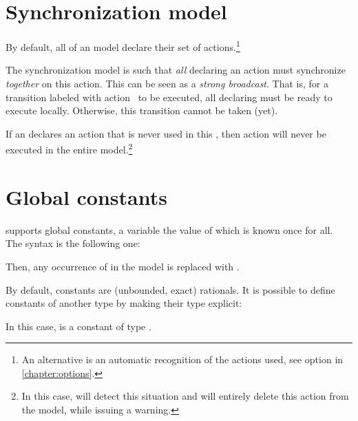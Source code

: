 \section{Synchronization model}\label{sect:synchronization}

By default, all \IPTA{} of an \imitator{} model declare their set of actions.\footnote{%
	An alternative is an automatic recognition of the actions used, see option  in \cref{chapter:options}.
}

The \imitator{} synchronization model is such that \emph{all} \IPTA{} declaring an action must synchronize \emph{together} on this action.
This can be seen as a \emph{strong broadcast}.
That is, for a transition labeled with action~ to be executed, all \IPTA{} declaring  must be ready to execute  locally.
Otherwise, this transition cannot be taken (yet).

If an \IPTA{} declares an action  that is never used in this \IPTA{}, then action  will never be executed in the entire model.\footnote{%
	In this case, \imitator{} will detect this situation and will entirely delete this action from the model, while issuing a warning.
}

\section{Global constants}

\imitator{} supports global constants, \ie{} a variable the value of which is known once for all.
The syntax is the following one:
\begin{center}
\end{center}
Then, any occurrence of  in the model is replaced with .

By default, constants are (unbounded, exact) rationals.
It is possible to define constants of another type by making their type explicit:

\begin{center}
\end{center}

In this case,  is a constant of type .

